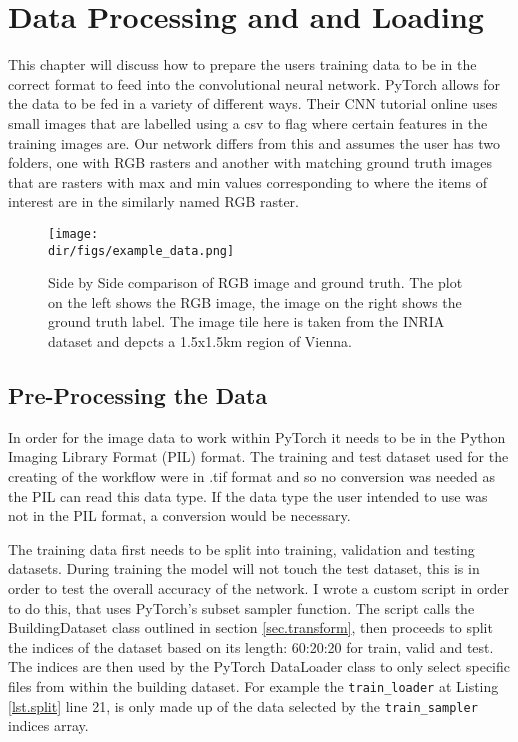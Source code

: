 \chapter{Data Processing and and Loading}
This chapter will discuss how to prepare the users training data to be in the correct format to feed into the convolutional neural network. PyTorch allows for the data to be fed in a variety of different ways. Their CNN tutorial online uses small images that are labelled using a csv to flag where certain features in the training images are. Our network differs from this and assumes the user has two folders, one with RGB rasters and another with matching ground truth images that are rasters with max and min values corresponding to where the items of interest are in the similarly named RGB raster. 

\begin{figure}[htbp]
    \centering
    \texttt{[image: \\dir/figs/example\_data.png]}
    \caption[Side by Side comparison of RGB image and ground truth]{Side by Side comparison of RGB image and ground truth. The plot on the left shows the RGB image, the image on the right shows the ground truth label. The image tile here is taken from the INRIA dataset and depcts a 1.5x1.5km region of Vienna.}
    \label{fig.example_data}
\end{figure}


\section{Pre-Processing the Data}
In order for the image data to work within PyTorch it needs to be in the Python Imaging Library Format (PIL) format. The training and test dataset used for the creating of the workflow were in .tif format and so no conversion was needed as the PIL can read this data type. If the data type the user intended to use was not in the PIL format, a conversion would be necessary.
\par
The training data first needs to be split into training, validation and testing datasets. During training the model will not touch the test dataset, this is in order to test the overall accuracy of the network. I wrote a custom script in order to do this, that uses PyTorch's subset sampler function. The script calls the BuildingDataset class outlined in section \ref{sec.transform}, then proceeds to split the indices of the dataset based on its length: 60:20:20 for train, valid and test. The indices are then used by the PyTorch DataLoader class to only select specific files from within the building dataset. For example the \texttt{train\_loader} at  Listing \ref{lst.split} line 21, is only made up of the data selected by the \texttt{train\_sampler} indices array. 

